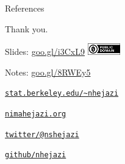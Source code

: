 \documentclass[12pt,t,handout]{beamer}
\begin{document}

\begin{frame}[c,allowframebreaks]{References}


\nocite{*}



\end{frame}


\begin{frame}[c]{Thank you.}

\Large
Slides: \href{https://goo.gl/i3CxL9}{goo.gl/i3CxL9} \quad
\includegraphics[height=5mm]{Figs/cc-zero.png}

\vspace{5mm}
Notes: \href{https://goo.gl/8RWEy5}{goo.gl/8RWEy5}

\vspace{5mm}
\href{https://www.stat.berkeley.edu/~nhejazi}{\tt stat.berkeley.edu/\textasciitilde{}nhejazi}

\vspace{5mm}
\href{http://nimahejazi.org}{\tt nimahejazi.org}

\vspace{5mm}
\href{https://twitter.com/nshejazi}{\tt twitter/@nshejazi}

\vspace{5mm}
\href{https://github.com/nhejazi}{\tt github/nhejazi}


\end{frame}

\end{document}
